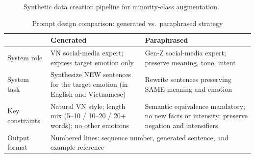 \documentclass[conference]{IEEEtran}
\begin{document}
\begin{figure}[H]
\centering
{}
\caption{Synthetic data creation pipeline for minority-class augmentation.}
\label{fig:aug_pipeline}
\end{figure}

\begin{table}[H]
\caption{Prompt design comparison: generated vs.\ paraphrased strategy}
\label{tab:prompt_design}
\centering
\footnotesize
\begin{tabular}{@{}p{}p{}p{}@{}}
\toprule
 & \textbf{Generated} & \textbf{Paraphrased} \\
\midrule
System role &
  VN social-media expert; express target emotion only &
  Gen-Z social-media expert; preserve meaning, tone, intent \\
\midrule
System task &
  Synthesize NEW sentences for the target emotion (in English and Vietnamese) &
  Rewrite sentences preserving SAME meaning and emotion \\
\midrule
Key constraints &
  Natural VN style; length mix (5--10 / 10--20 / 20+ words); no other emotions &
  Semantic equivalence mandatory; no new facts or intensity; preserve negation and intensifiers \\
\midrule
Output format &
  \multicolumn{2}{p{0.62\columnwidth}}{Numbered lines: sequence number, generated sentence, and example reference} \\
\bottomrule
\end{tabular}
\end{table}
\end{document}
